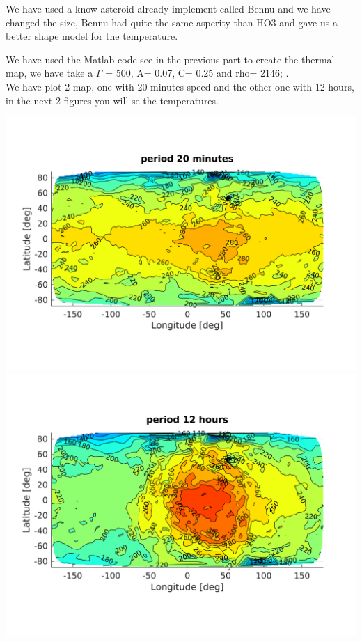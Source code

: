 We have used a know asteroid already implement called Bennu and we have changed the size, Bennu had quite the same asperity than HO3 and gave us a better shape model for the temperature.


We have used the Matlab code see in the previous part to create the thermal map, we have take a $\Gamma$ = 500, A= 0.07, C= 0.25 and rho= 2146; .\\[10pt]

We have plot 2 map, one with 20 minutes speed and the other one with 12 hours, in the next 2 figures you will se the temperatures.\\[10pt]


\begin{center} %
    \includegraphics[width=\linewidth]{rsc/theo20mn.png}
    \includegraphics[width=\linewidth]{rsc/theo12h.png}
\end{center}

